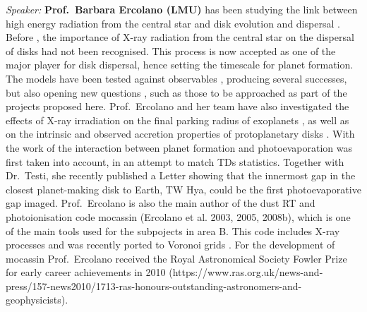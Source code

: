 \documentclass[10pt,fleqn,twoside,a4paper]{article}
\begin{document}
{\it Speaker: }{\bf Prof.\ Barbara Ercolano (LMU)} has been studying the link between high
energy radiation from the central star and disk evolution and
dispersal \citep[e.g.,][]{2008ApJ...688..398E, 2009ApJ...699.1639E,
2010MNRAS.401.1415O, 2011MNRAS.412...13O, 2012MNRAS.422.1880O}. 
Before \citet{2009ApJ...699.1639E}, the importance
of X-ray radiation from the central star on the dispersal of disks had
not been recognised. This process is now accepted as one of the major
player for disk dispersal, hence setting the timescale for planet
formation. The models have been tested against observables
\citep[e.g.][]{2010MNRAS.406.1553E, 2013MNRAS.434.3378O, 2013MNRAS.428.3327K,
2015MNRAS.452.3689E}, producing
several successes, but also opening new questions 
\citep[e.g.,][]{2016MNRAS.460.3472E}, such as those to be
approached as part of the projects proposed here. Prof.\ Ercolano and
her team have also investigated the effects of X-ray irradiation on
the final parking radius of exoplanets \citep{2015MNRAS.450.3008E}, as
well as on the intrinsic \citep{2013MNRAS.436.3446E, 2013ApJ...764...65M}
and observed
accretion properties of protoplanetary disks \citep{2014MNRAS.439..256E}. 
With the work of \citet{2013MNRAS.430.1392R, 2015MNRAS.454.2173R} 
the interaction between planet formation and photoevaporation was first
taken into account, in an attempt to match TDs
statistics. Together with Dr.\ Testi, she recently published a Letter
showing that the innermost gap in the closest planet-making disk to
Earth, TW Hya, could be the first photoevaporative gap
imaged. Prof.\ Ercolano is also the main author of the dust RT and 
photoionisation code {\sc mocassin} (Ercolano et al. 2003, 2005,
2008b), which is one of the main tools
used for the subpojects in area B. This code includes X-ray processes
and was recently ported to Voronoi grids \citep{2016MNRAS.456..756H}. 
For the development of {\sc
  mocassin} Prof.\ Ercolano received the Royal Astronomical Society
Fowler Prize for early career achievements in 2010 (https://www.ras.org.uk/news-and-press/157-news2010/1713-ras-honours-outstanding-astronomers-and-geophysicists). \\
\end{document}
